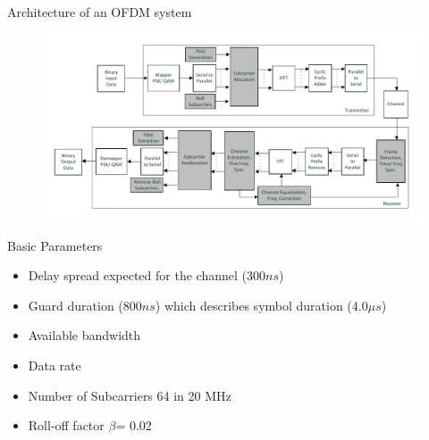 \documentclass{beamer}
\begin{document}
\begin{frame}{Architecture of an OFDM system}
\begin{figure}[h!]
\centering
\includegraphics[width=\textwidth]{content/fig/practical_bb_ofdm.pdf}
\end{figure}
\end{frame}

\begin{frame}{Basic Parameters}
  \begin{itemize}
   
  \item {
Delay spread expected for the channel ($300 ns$)
  }
  
  \item {  
Guard duration ($800 ns$) which describes symbol duration ($4.0 \mu s$)
  }
  
  \item {  
Available bandwidth
  }
  
  \item {  
Data rate
  }

  \item {  
Number of Subcarriers 64 in 20 MHz
  }  

  \item {  
Roll-off factor $\beta$= 0.02
  }  
  
  \end{itemize}
\end{frame}
\end{document}
